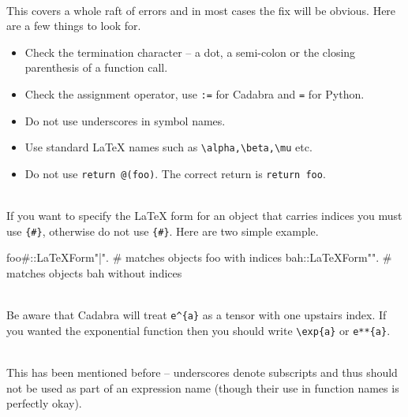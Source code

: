\documentclass[a4paper,12pt]{article}
\numberwithin{equation}{section}%
\begin{document}
\begin{enumerate}

   \\[5pt]
   This covers a whole raft of errors and in most cases the fix will be obvious. Here are a
   few things to look for.
   \begin{itemize}
      \item Check the termination character -- a dot, a semi-colon or the closing parenthesis
            of a function call.
      \item Check the assignment operator, use \verb|:=| for Cadabra and \verb|=| for Python.
      \item Do not use underscores in symbol names.
      \item Use standard LaTeX names such as \verb|\alpha,\beta,\mu| etc.
      \item Do not use \verb|return @(foo)|. The correct return is \verb|return foo|.
   \end{itemize}

   \\[5pt]
   If you want to specify the LaTeX form for an object that carries indices you
   must use \verb|{#}|, otherwise do not use \verb|{#}|. Here are two simple example.
   \begin{cadabra}
      foo{#}::LaTeXForm{"{\bar\alpha}"}.    # matches objects foo with indices
      bah::LaTeXForm{"{\hat\beta}"}.        # matches objects bah without indices
   \end{cadabra}

   \\[5pt]
   Be aware that Cadabra will treat \verb|e^{a}| as a tensor with one upstairs index. If you
   wanted the exponential function then you should write \verb|\exp{a}| or \verb|e**{a}|.

   \\[5pt]
   This has been mentioned before -- underscores denote subscripts and thus should
   not be used as part of an expression name (though their use in function names is
   perfectly okay).


\end{enumerate}
\end{document}
